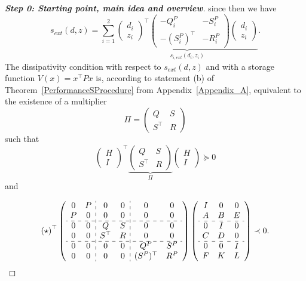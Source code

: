 \documentclass[11pt,a4paper,oneside,DIV=12,headings=small]{scrartcl}
\theoremstyle{plain}
\begin{document}
\begin{proof}[\textbf{Step 0: \emph{Starting point, main idea and overview}}]
since then we have
\begin{equation}
s_{ext}(d,z)=
\sum_{i=1}^2 \underbrace{\begin{pmatrix}d_i \\ z_i \end{pmatrix}^\top
\begin{pmatrix} -Q_{i}^P & -S_{i}^P \\ -(S_{i}^P)^\top & -R_{i}^P \end{pmatrix}
\begin{pmatrix}d_i \\ z_i \end{pmatrix}}_{s_{i,ext}(d_i,z_i)}.
\end{equation}
The dissipativity condition with respect to $s_{ext}(d,z)$ and with a storage function $V(x)=x^\top P x$ is, according to statement (b) of Theorem~\ref{PerformanceSProcedure} from Appendix~\ref{Appendix_A}, equivalent to the existence of a multiplier 
\begin{equation}
\label{MultiplierPi}
\Pi=\begin{pmatrix} Q & S \\ S^\top & R \end{pmatrix}
\end{equation}
such that
\begin{equation}
\label{NN1_53}
\begin{pmatrix} H \\ I \end{pmatrix}^\top 
\underbrace{\begin{pmatrix} Q & S \\ S^\top & R \end{pmatrix}}_{\Pi}
\begin{pmatrix} H \\ I \end{pmatrix} \succeq  0 
\end{equation}
and 

\begin{equation}
\label{NN2_53}
\left(\star\right)^\top
\left(\begin{array}{cc:cc:cc} 0 & P & 0 & 0 & 0 & 0\\ 
P & 0 & 0 & 0 & 0 & 0 \\ \hdashline 
0 & 0 & Q & S & 0 & 0\\ 
0 & 0 & S^\top & R  & 0 & 0 \\ \hdashline
0 & 0 & 0 & 0 & Q^P & S^P \\
0 & 0 & 0 & 0 & (S^P)^\top & R^P 
 \end{array}\right)
\left(\begin{array}{ccc} I & 0 & 0 \\ A & B & E \\ \hdashline 0 & I & 0 \\ C & D & 0 \\ \hdashline 0 & 0 & I \\ F & K & L \end{array}\right) \prec 0.
\end{equation}


\end{proof}
\end{document}
